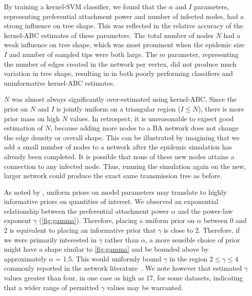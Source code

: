 \documentclass[12pt]{article}\usepackage[]{graphicx}\usepackage[]{color}
\begin{document}
By training a kernel-SVM classifier, we found that the $\alpha$ and $I$
parameters, representing preferential attachment power and number of infected
nodes, had a strong influence on tree shape. This was reflected in the relative
accuracy of the kernel-ABC estimates of these parameters. The total number of
nodes $N$ had a weak influence on tree shape, which was most prominent when the
epidemic size $I$ and number of sampled tips were both large. The $m$
parameter, representing the number of edges created in the network per vertex,
did not produce much variation in tree shape, resulting in in both poorly
performing classifiers and uninformative kernel-ABC estimates.

$N$ was almost always significantly over-estimated using kernel-ABC. Since the
prior on $N$ and $I$ is jointly uniform on a triangular region ($I \leq N$),
there is more prior mass on high $N$ values. In retrospect, it is unreasonable
to expect good estimation of $N$, because adding more nodes to a \gls{BA}
network does not change the edge density or overall shape. This can be
illustrated by imagining that we add a small number of nodes to a network after
the epidemic simulation has already been completed. It is possible that none of
these new nodes attains a connection to any infected node. Thus, running the
simulation again on the new, larger network could produce the exact same
transmission tree as before. 

As noted by \textcite{lintusaari2016identifiability}, uniform priors on model
parameters may translate to highly informative priors on quantities of
interest. We observed an exponential relationship between the preferential
attachment power $\alpha$ and the power-law exponent $\gamma$
(\cref{fig:gamma}). Therefore, placing a uniform prior on $\alpha$ between 0
and 2 is equivalent to placing an informative prior that $\gamma$ is close to
2. Therefore, if we were primarily interested in $\gamma$ rather than $\alpha$,
a more sensible choice of prior might have a shape similar to \cref{fig:gamma}
and be bounded above by approximately $\alpha$ = 1.5. This would uniformly
bound $\gamma$ in the region $2 \leq \gamma \leq 4$ commonly reported in the
network literature~\autocite{liljeros2001web, schneeberger2004scale,
colgate1989risk, brown2011transmission}. We note however that
\textcite{jones2003assessment} estimated $\gamma$ values greater than four, in
one case as high as 17, for some datasets, indicating that a wider range of
permitted $\gamma$ values may be warranted.
\end{document}
